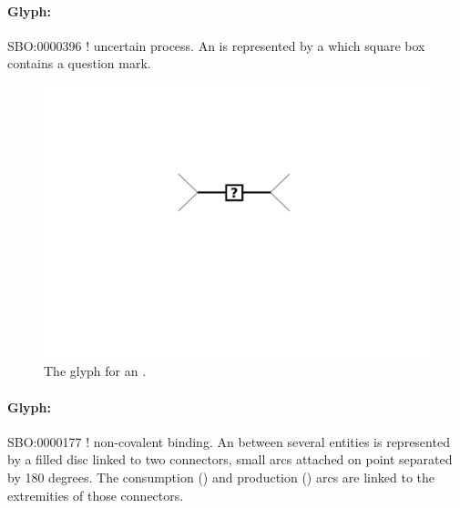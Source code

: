 
\paragraph{Glyph: }\label{sec:techref:uncertain}

\begin{glyphDescription}
 \glyphSboTerm SBO:0000396 ! uncertain process.
 \glyphNode An  is represented by a  which square box contains a question mark.
 \end{glyphDescription}

\begin{figure}[htb]
  \centering
  \includegraphics[scale = 0.5]{images/uncertain}
  \caption{The \PD glyph for an .}
  \label{fig:techref:uncertain}
\end{figure}



\paragraph{Glyph: }\label{sec:techref:association}


\begin{glyphDescription}
 \glyphSboTerm SBO:0000177 ! non-covalent binding.
 \glyphNode An  between several entities is represented by a filled disc linked to two connectors, small arcs attached on point separated by 180 degrees. The consumption () and production () arcs are linked to the extremities of those connectors.
 \end{glyphDescription}

